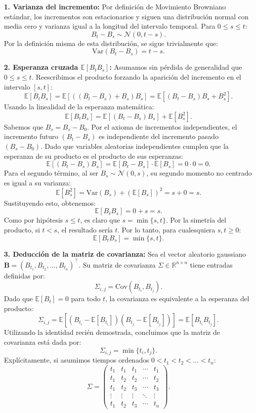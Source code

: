 \documentclass[11pt, letterpaper]{article}
\begin{document}
\begin{solucion}
    \textbf{1. Varianza del incremento:}
    Por definición de Movimiento Browniano estándar, los incrementos son estacionarios y siguen una distribución normal con media cero y varianza igual a la longitud del intervalo temporal. Para $0 \le s \le t$:
    \[ B_t - B_s \sim \mathcal{N}(0, t-s). \]
    Por la definición misma de esta distribución, se sigue trivialmente que:
    \[ \text{Var}(B_t - B_s) = t - s. \]

    \textbf{2. Esperanza cruzada $\mathbb{E}[B_t B_s]$:}
    Asumamos sin pérdida de generalidad que $0 \le s \le t$. Reescribimos el producto forzando la aparición del incremento en el intervalo $[s, t]$:
    \[ \mathbb{E}[B_t B_s] = \mathbb{E}[((B_t - B_s) + B_s) B_s] = \mathbb{E}[(B_t - B_s)B_s + B_s^2]. \]
    Usando la linealidad de la esperanza matemática:
    \[ \mathbb{E}[B_t B_s] = \mathbb{E}[(B_t - B_s)B_s] + \mathbb{E}[B_s^2]. \]
    Sabemos que $B_s = B_s - B_0$. Por el axioma de incrementos independientes, el incremento futuro $(B_t - B_s)$ es independiente del incremento pasado $(B_s - B_0)$. Dado que variables aleatorias independientes cumplen que la esperanza de su producto es el producto de sus esperanzas:
    \[ \mathbb{E}[(B_t - B_s)B_s] = \mathbb{E}[B_t - B_s] \cdot \mathbb{E}[B_s] = 0 \cdot 0 = 0. \]
    Para el segundo término, al ser $B_s \sim \mathcal{N}(0, s)$, su segundo momento no centrado es igual a su varianza:
    \[ \mathbb{E}[B_s^2] = \text{Var}(B_s) + (\mathbb{E}[B_s])^2 = s + 0 = s. \]
    Sustituyendo esto, obtenemos:
    \[ \mathbb{E}[B_t B_s] = 0 + s = s. \]
    Como por hipótesis $s \le t$, es claro que $s = \min\{s, t\}$. Por la simetría del producto, si $t < s$, el resultado sería $t$. Por lo tanto, para cualesquiera $s, t \ge 0$:
    \[ \mathbb{E}[B_t B_s] = \min\{s, t\}. \]

    \textbf{3. Deducción de la matriz de covarianza:}
    Sea el vector aleatorio gaussiano $\mathbf{B} = (B_{t_1}, B_{t_2}, \dots, B_{t_n})^\top$. 
    Su matriz de covarianza $\Sigma \in \mathbb{R}^{n \times n}$ tiene entradas definidas por:
    \[ \Sigma_{i,j} = \text{Cov}(B_{t_i}, B_{t_j}). \]
    Dado que $\mathbb{E}[B_t] = 0$ para todo $t$, la covarianza es equivalente a la esperanza del producto:
    \[ \Sigma_{i,j} = \mathbb{E}[(B_{t_i} - \mathbb{E}[B_{t_i}])(B_{t_j} - \mathbb{E}[B_{t_j}])] = \mathbb{E}[B_{t_i} B_{t_j}]. \]
    Utilizando la identidad recién demostrada, concluimos que la matriz de covarianza está dada por:
    \[ \Sigma_{i,j} = \min\{t_i, t_j\}. \]
    Explícitamente, si asumimos tiempos ordenados $0 < t_1 < t_2 < \dots < t_n$:
    \[ \Sigma = \begin{pmatrix} 
    t_1 & t_1 & t_1 & \cdots & t_1 \\
    t_1 & t_2 & t_2 & \cdots & t_2 \\
    t_1 & t_2 & t_3 & \cdots & t_3 \\
    \vdots & \vdots & \vdots & \ddots & \vdots \\
    t_1 & t_2 & t_3 & \cdots & t_n
    \end{pmatrix}. \]
\end{solucion}
\end{document}
